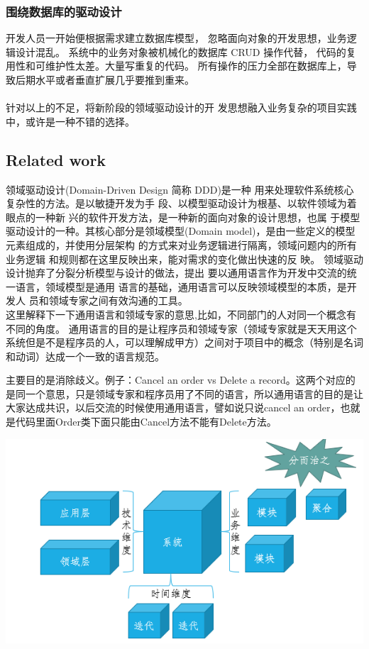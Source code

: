 \documentclass[journal]{IEEEtran}
\begin{document}
\begin{CJK*}{UTF8}{gbsn}
\subsubsection {围绕数据库的驱动设计}
开发人员一开始便根据需求建立数据库模型， 忽略面向对象的开发思想，业务逻辑设计混乱。
系统中的业务对象被机械化的数据库 CRUD 操作代替， 
代码的复用性和可维护性太差。大量写重复的代码。
所有操作的压力全部在数据库上，导致后期水平或者垂直扩展几乎要推到重来。
\\
\\ 针对以上的不足，将新阶段的领域驱动设计的开
发思想融入业务复杂的项目实践中，或许是一种不错的选择。




\subsection{Related work}
  领域驱动设计(Domain-Driven Design 简称 DDD)是一种
用来处理软件系统核心复杂性的方法。是以敏捷开发为手
段、以模型驱动设计为根基、以软件领域为着眼点的一种新
兴的软件开发方法，是一种新的面向对象的设计思想，也属
于模型驱动设计的一种。其核心部分是领域模型(Domain
model)，是由一些定义的模型元素组成的，并使用分层架构
的方式来对业务逻辑进行隔离，领域问题内的所有业务逻辑
和规则都在这里反映出来，能对需求的变化做出快速的反
映。
\newline
\indent
  领域驱动设计抛弃了分裂分析模型与设计的做法，提出
要以通用语言作为开发中交流的统一语言，领域模型是通用
语言的基础，通用语言可以反映领域模型的本质，是开发人
员和领域专家之间有效沟通的工具。
\\

这里解释下一下通用语言和领域专家的意思,比如，不同部门的人对同一个概念有不同的角度。
通用语言的目的是让程序员和领域专家（领域专家就是天天用这个系统但是不是程序员的人，可以理解成甲方）之间对于项目中的概念（特别是名词和动词）达成一个一致的语言规范。

主要目的是消除歧义。例子：Cancel an order vs Delete a record。这两个对应的是同一个意思，只是领域专家和程序员用了不同的语言，所以通用语言的目的是让大家达成共识，以后交流的时候使用通用语言，譬如说只说cancel an order，也就是代码里面Order类下面只能由Cancel方法不能有Delete方法。

\includegraphics[scale=0.4]{2.png}

\end{CJK*}
\end{document}
